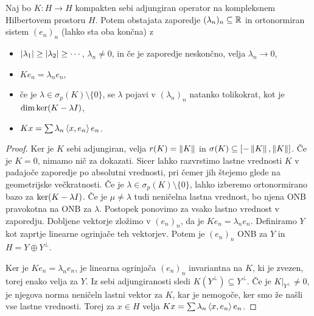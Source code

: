 \begin{izrek}
  Naj bo $K: H \to H$ kompakten sebi adjungiran operator na kompleksnem
  Hilbertovem prostoru $H$.
  Potem obstajata zaporedje $(\lambda_n)_n \subseteq \mathbb{R}$ in ortonormiran sistem
  $(e_n)_n$ (lahko sta oba končna) z
  \begin{itemize}
  \item $\left| \lambda_1 \right| \ge \left| \lambda_2 \right| \ge \cdots$, $\lambda_n \ne 0$, in
	če je zaporedje neskončno, velja $\lambda_n \to 0$,
  \item $K e_n = \lambda_n e_n$,
  \item če je $\lambda \in \sigma_p(K) \setminus \{0\}$, se $\lambda$ pojavi v
	$(\lambda_n)_n$ natanko tolikokrat, kot je $\dim \operatorname{ker} (K - \lambda I)$,
  \item $Kx = \sum \lambda_n \left< x, e_n \right> e_n$.
  \end{itemize}
\end{izrek}

\begin{proof}
  Ker je $K$ sebi adjungiran, velja $r(K) = \left\lVert K\right\rVert$ in $\sigma(K) \subseteq
  [-\left\lVert K\right\rVert, \left\lVert K\right\rVert]$.
  Če je $K = 0$, nimamo nič za dokazati.
  Sicer lahko razvrstimo lastne vrednosti $K$ v padajoče zaporedje po absolutni
  vrednosti, pri čemer jih štejemo glede na geometrijske večkratnosti.
  Če je $\lambda \in \sigma_p(K) \setminus \{0\}$, lahko izberemo ortonormirano
  bazo za $\operatorname{ker} (K - \lambda I)$.
  Če je $\mu \ne \lambda$ tudi neničelna lastna vrednost, bo njena ONB
  pravokotna na ONB za $\lambda$.
  Postopek ponovimo za vsako lastno vrednost v zaporedju.
  Dobljene vektorje zložimo v $(e_n)_n$, da je $K e_n = \lambda_n e_n$.
  Definiramo $Y$ kot zaprtje linearne ogrinjače teh vektorjev.
  Potem je $(e_n)_n$ ONB za $Y$ in $H = Y \oplus Y^\bot$.

  Ker je $K e_n = \lambda_n e_n$, je linearna ogrinjača $(e_n)_n$ invariantna na
  $K$, ki je zvezen, torej enako velja za $Y$.
  Iz sebi adjungiranosti sledi $K(Y^\bot) \subseteq Y^\bot$.
  Če je $\left. K \right|_{Y^\bot} \ne 0$, je njegova norma neničeln lastni
  vektor za $K$, kar je nemogoče, ker smo že našli vse lastne vrednosti.
  Torej za $x \in H$ velja $Kx = \sum \lambda_n \left< x, e_n \right> e_n$.
\end{proof}

